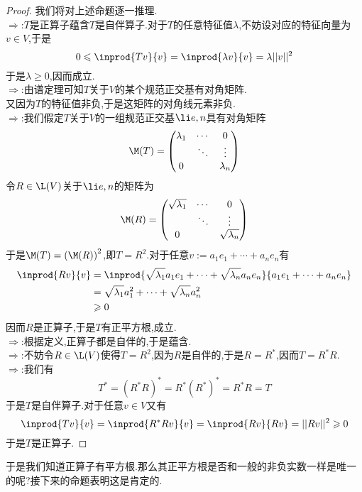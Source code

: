 \documentclass{ctexart}
\begin{document}
\begin{proof}
    我们将对上述命题逐一推理.\\
    $\Rightarrow$:$T$是正算子蕴含$T$是自伴算子.对于$T$的任意特征值$\lambda$,不妨设对应的特征向量为$v\in V$,于是
    \[0\leqslant\inprod{Tv}{v}=\inprod{\lambda v}{v}=\lambda||v||^2\]
    于是$\lambda\geqslant0$,因而成立.\\
    $\Rightarrow$:由谱定理可知$T$关于$V$的某个规范正交基有对角矩阵.\\
    又因为$T$的特征值非负,于是这矩阵的对角线元素非负.\\
    $\Rightarrow$:我们假定$T$关于$V$的一组规范正交基$\li e,n$具有对角矩阵
    \[\M(T)=\begin{pmatrix}
        \lambda_1 & \cdots & 0 \\
        & \ddots & \vdots\\
        0 & & \lambda_n
    \end{pmatrix}\]
    令$R\in\L(V)$关于$\li e,n$的矩阵为
    \[\M(R)=\begin{pmatrix}
        \sqrt{\lambda_1} & \cdots & 0 \\
        & \ddots & \vdots\\
        0 & & \sqrt{\lambda_n}
    \end{pmatrix}\]
    于是$\M(T)=\left(\M(R)\right)^2$,即$T=R^2$.对于任意$v:=a_1e_1+\cdots+a_ne_n$有
    \[\begin{aligned}
        \inprod{Rv}{v}
        &= \inprod{\sqrt{\lambda_1}a_1e_1+\cdots+\sqrt{\lambda_n}a_ne_n}{a_1e_1+\cdots+a_ne_n} \\
        &= \sqrt{\lambda_1}a_1^2+\cdots+\sqrt{\lambda_n}a_n^2 \\
        &\geqslant 0
    \end{aligned}\]
    因而$R$是正算子,于是$T$有正平方根,成立.\\
    $\Rightarrow$:根据定义,正算子都是自伴的,于是蕴含.\\
    $\Rightarrow$:不妨令$R\in\L(V)$使得$T=R^2$,因为$R$是自伴的,于是$R=R^*$,因而$T=R^*R$.\\
    $\Rightarrow$:我们有
    \[T^*=\left(R^*R\right)^*=R^*\left(R^*\right)^*=R^*R=T\]
    于是$T$是自伴算子.对于任意$v\in V$又有
    \[\inprod{Tv}{v}=\inprod{R^*Rv}{v}=\inprod{Rv}{Rv}=||Rv||^2\geqslant0\]
    于是$T$是正算子.
\end{proof}\noindent
于是我们知道正算子有平方根.那么其正平方根是否和一般的非负实数一样是唯一的呢?接下来的命题表明这是肯定的.
\end{document}
